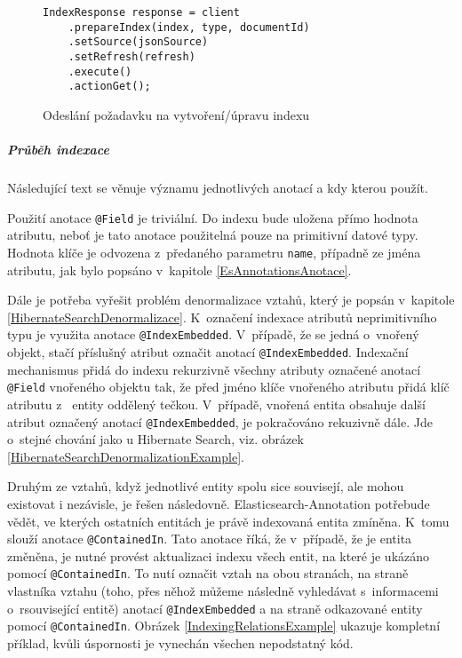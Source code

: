 \documentclass[11pt,oneside]{fithesis2}
\begin{document}
\begin{figure}[!htbp]
\begin{lstlisting}[frame=single]
IndexResponse response = client
	.prepareIndex(index, type, documentId)
	.setSource(jsonSource)
	.setRefresh(refresh)
	.execute()
	.actionGet();
\end{lstlisting}
\caption{Odeslání požadavku na vytvoření/úpravu indexu}
\label{EsAnnotationsIndexaceOdeslaniPozadavkuExample}
\end{figure}


\subparagraph{Průběh indexace}
\label{EsAnnotationsIndexacniCast}
Následující text se věnuje významu jednotlivých anotací a kdy kterou použít.

Použití anotace \texttt{@Field} je triviální. Do indexu bude uložena přímo hodnota atributu, neboť je tato anotace použitelná pouze na primitivní datové typy. Hodnota klíče je odvozena z~předaného parametru \texttt{name}, případně ze jména atributu, jak bylo popsáno v~kapitole \ref{EsAnnotationsAnotace}. 

Dále je potřeba vyřešit problém denormalizace vztahů, který je popsán v~kapitole \ref{HibernateSearchDenormalizace}. K~označení indexace atributů neprimitivního typu je využita anotace \texttt{@IndexEmbedded}. V~případě, že se jedná o~vnořený objekt, stačí příslušný atribut označit anotací \texttt{@IndexEmbedded}. Indexační mechanismus přidá do indexu rekurzivně všechny atributy označené anotací \texttt{@Field} vnořeného objektu tak, že před jméno klíče vnořeného atributu přidá klíč atributu z~ entity oddělený tečkou. V~případě, vnořená entita obsahuje další atribut označený anotací \texttt{@IndexEmbedded}, je pokračováno rekuzivně dále. Jde o~stejné chování jako u Hibernate Search, viz. obrázek \ref{HibernateSearchDenormalizationExample}.

Druhým ze vztahů, když jednotlivé entity spolu sice souvisejí, ale mohou existovat i nezávisle, je řešen následovně. Elasticsearch-Annotation potřebude vědět, ve kterých ostatních entitách je právě indexovaná entita zmíněna. K~tomu slouží anotace \texttt{@ContainedIn}. Tato anotace říká, že v~případě, že je entita změněna, je nutné provést aktualizaci indexu všech entit, na které je ukázáno pomocí \texttt{@ContainedIn}. To nutí označit vztah na obou stranách, na straně vlastníka vztahu (toho, přes něhož můžeme následně vyhledávat s~informacemi o~rsouvisející entitě) anotací \texttt{@IndexEmbedded} a na straně odkazované entity pomocí \texttt{@ContainedIn}. Obrázek \ref{IndexingRelationsExample} ukazuje kompletní příklad, kvůli úspornosti je vynechán všechen nepodstatný kód.
\end{document}

